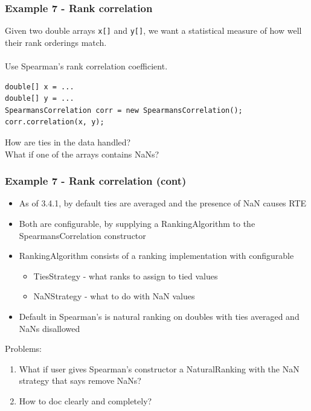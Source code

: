 \documentclass[14pt,mathserif]{beamer}
\begin{document}
\begin{frame}[fragile]
  \frametitle{Example 7 - Rank correlation}

Given two double arrays \texttt{x[]} and \texttt{y[]}, we want
a statistical measure of how well their rank orderings match. \\ ~ \\
Use Spearman's rank correlation coefficient.

\begin{verbatim}
double[] x = ...
double[] y = ...
SpearmansCorrelation corr = new SpearmansCorrelation();
corr.correlation(x, y);
\end{verbatim}

How are ties in the data handled? \\
What if one of the arrays contains NaNs?
\end{frame}

\begin{frame}
  \frametitle{Example 7 - Rank correlation (cont)}

\begin{small}
\begin{itemize}
\item As of 3.4.1, by default ties are averaged and the presence of NaN causes RTE
\item Both are configurable, by supplying a RankingAlgorithm to the SpearmansCorrelation
constructor
\item RankingAlgorithm consists of a ranking implementation with configurable
\begin{itemize}
  \item TiesStrategy - what ranks to assign to tied values
  \item NaNStrategy - what to do with NaN values
\end{itemize}
\item Default in Spearman's is natural ranking on doubles with ties averaged and NaNs disallowed
\end{itemize}
Problems: 
\begin{enumerate}
\item What if user gives Spearman's constructor a NaturalRanking with the NaN strategy
that says remove NaNs? 
\item How to doc clearly and completely?
\end{enumerate}
\end{small}
\end{frame}
\end{document}
